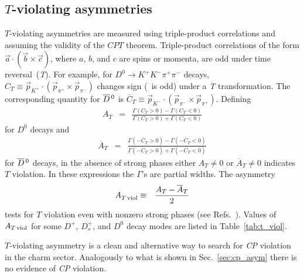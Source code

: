 \subsection{\emph{$T$}-violating asymmetries}
                                               
$T$-violating asymmetries are measured using triple-product
correlations and assuming the validity of the $CPT$ theorem.
Triple-product correlations of the form 
$\vec{a}\cdot(\vec{b}\times\vec{c})$, 
where $a$, $b$, and $c$ are spins or momenta, are odd 
under time reversal~(\emph{T}).
For example, for $D^0 \to K^+K^-\pi^+\pi^-$ decays, 
$C_T \equiv \vec{p}^{}_{K^+}\cdot(\vec{p}_{\pi^+}\times \vec{p}_{\pi^-})$  
changes sign (\ie\ is odd) under a \emph{T} transformation.
The corresponding quantity for $\overline{D}{}^{\,0}$ is
$\overline{C}_T \equiv 
      \vec{p}^{}_{K^-}\cdot(\vec{p}_{\pi^-}\times \vec{p}_{\pi^+})$.
Defining  
\begin{eqnarray}
 A_{T} & = &
    \frac{\Gamma(C_T>0)-\Gamma(C_T<0)}{\Gamma(C_T>0)+\Gamma(C_T<0)}
\end{eqnarray}
for $D^0$ decays and
\begin{eqnarray}
\overline{A}_{T} & = & 
   \frac{\Gamma(-\overline{C}_T>0)-\Gamma(-\overline{C}_T<0)}
                        {\Gamma(-\overline{C}_T>0)+\Gamma(-\overline{C}_T<0)}
\end{eqnarray} 
for $\overline{D}{}^{\,0}$ decays, in the absence of strong phases
either $A^{}_T\neq 0$ or $\overline{A}^{}_T\neq 0$ indicates
$T$ violation. In these expressions the $\Gamma$'s are partial widths. 
The asymmetry
\begin{eqnarray}
A^{}_{T\,{\rm viol}} & \equiv & \frac{A_{T}-\overline{A}_{T}}{2}
\end{eqnarray}
tests for $T$ violation even with nonzero strong phases (see 
Refs.~\cite{Golowich:1988ig,Bigi:2001sg,Bensalem:2002ys,Bensalem:2000hq,Bensalem:2002pz}).
Values of $A_{T\,{\rm viol}}$ for some $D^+$, $D^+_s$, and
$D^0$ decay modes are listed in Table~\ref{tab:t_viol}.

$T$-violating asymmetry is a clean and alternative way to search for \emph{CP} violation
in the charm sector. Analogously to what is shown in Sec.~\ref{sec:cp_asym} 
there is no evidence of \emph{CP} violation. 


